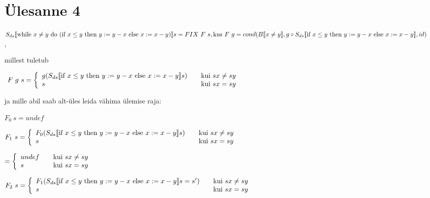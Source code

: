 \section{Ülesanne 4}

\(
S_{ds} \llbracket
\text{while\ } x \neq y \text{\ do\ }
  (\text{if\ } x \leq y
  \text{\ then\ } y := y - x \text{\ else\ } x := x - y )
\rrbracket s
= FIX \ F \ s,
\\
\text{kus} \ F \  g = cond(B \llbracket x \neq y \rrbracket, 
g \circ S_{ds} \llbracket \text{if\ } x \leq y \text{\ then\ } y := y - x
\text{\ else\ } x := x - y \rrbracket,
id
)
\),

millest tuletub 

\(
  \ F \  g \ s = \left\{
  \begin{array}{l l}
    g(
      S_{ds} \llbracket
        \text{if\ } x \leq y
        \text{\ then\ } y := y - x \text{\ else\ } x := x - y
      \rrbracket s
    ) & \quad \text{kui}\ sx \neq sy \\
    s   & \quad \text{kui}\ sx = sy\\
  \end{array} \right.
\)

ja mille abil saab alt-üles leida vähima ülemise raja:

\(
F_0 \  s = undef
\)

\(
F_1 \  s = \left\{
  \begin{array}{l l}
    F_0(
      S_{ds} \llbracket
        \text{if\ } x \leq y
        \text{\ then\ } y := y - x \text{\ else\ } x := x - y
      \rrbracket s
    ) & \quad \text{kui}\ sx \neq sy \\
    s   & \quad \text{kui}\ sx = sy\\
  \end{array} \right.
\)

\(
= \left\{
  \begin{array}{l l}
    undef & \quad \text{kui}\ sx \neq sy \\
    s   & \quad \text{kui}\ sx = sy\\
  \end{array} \right.
\)

\(
F_2 \ s = \left\{
    \begin{array}{l l}
    F_1(
      S_{ds} \llbracket
        \text{if\ } x \leq y
        \text{\ then\ } y := y - x \text{\ else\ } x := x - y
      \rrbracket s = s'
    ) & \quad \text{kui}\ sx \neq sy \\
    s   & \quad \text{kui}\ sx = sy\\
  \end{array} \right.
\)

